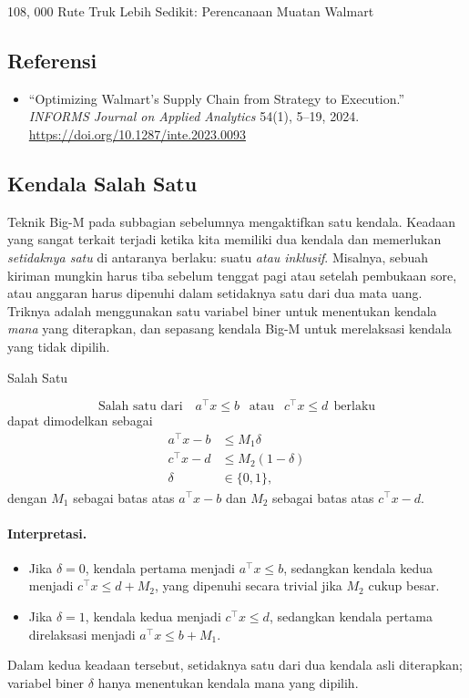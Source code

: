 \begin{casestudybox}{108{,}
\label{case:walmart-loads}000 Rute Truk Lebih Sedikit: Perencanaan Muatan Walmart}
\subsection*{Referensi}
\begin{itemize}
\item ``Optimizing Walmart's Supply Chain from Strategy to Execution.'' \emph{INFORMS Journal on Applied Analytics} 54(1), 5--19, 2024. \url{https://doi.org/10.1287/inte.2023.0093}
\end{itemize}
\end{casestudybox}

\subsection{Kendala Salah Satu}
\label{subsec:either-or}
Teknik Big-M pada subbagian sebelumnya mengaktifkan satu kendala. Keadaan yang sangat terkait terjadi ketika kita memiliki dua kendala dan memerlukan \emph{setidaknya satu} di antaranya berlaku: suatu \emph{atau inklusif}. Misalnya, sebuah kiriman mungkin harus tiba sebelum tenggat pagi atau setelah pembukaan sore, atau anggaran harus dipenuhi dalam setidaknya satu dari dua mata uang. Triknya adalah menggunakan satu variabel biner untuk menentukan kendala \emph{mana} yang diterapkan, dan sepasang kendala Big-M untuk merelaksasi kendala yang tidak dipilih.
\begin{general}{Salah Satu}{}{}

\begin{equation}
\text{Salah satu dari } \ \ \ a^\top x \leq b\ \  \text{ atau } \ \  c^\top x \leq d \ \ \text{berlaku}
\end{equation}
dapat dimodelkan sebagai
\begin{equation}
\begin{split}
a^\top x - b &\leq M_1 \delta\\
c^\top x - d &\leq M_2 (1-\delta)\\
\delta &\in \{0,1\},
\end{split}
\end{equation}
dengan $M_1$ sebagai batas atas $a^\top x - b$ dan $M_2$ sebagai batas atas $c^\top x - d$.
\end{general}

\paragraph{Interpretasi.}
\begin{itemize}
    \item Jika \(\delta = 0\), kendala pertama menjadi \(a^\top x \leq b\), sedangkan kendala kedua menjadi \(c^\top x \leq d + M_2\), yang dipenuhi secara trivial jika \(M_2\) cukup besar.
    \item Jika \(\delta = 1\), kendala kedua menjadi \(c^\top x \leq d\), sedangkan kendala pertama direlaksasi menjadi \(a^\top x \leq b + M_1\).
\end{itemize}
Dalam kedua keadaan tersebut, setidaknya satu dari dua kendala asli diterapkan; variabel biner $\delta$ hanya menentukan kendala mana yang dipilih.

